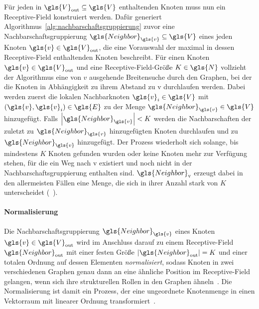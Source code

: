 Für jeden in $\gls{V}_{\mathrm{out}} \subseteq \gls{V}$ enthaltenden Knoten muss nun ein Receptive-Field konstruiert werden.
Dafür generiert Algorithmus~\ref{alg:nachbarschaftsgruppierung} zuvor eine Nachbarschaftsgruppierung $\gls{Neighbor}_{\gls{v}} \subseteq \gls{V}$ eines jeden Knoten $\gls{v} \in \gls{V}_{\mathrm{out}}$, die eine Vorauswahl der maximal in dessen Receptive-Field enthaltenden Knoten beschreibt.
Für einen Knoten $\gls{v} \in \gls{V}_{\mathrm{out}}$ und eine Receptive-Field-Größe $K \in \gls{N}$ vollzieht der Algorithmus eine von $v$ ausgehende Breitensuche durch den Graphen, bei der die Knoten in Abhängigkeit zu ihrem Abstand zu \gls{v} durchlaufen werden.
Dabei werden zuerst die lokalen Nachbarknoten $\gls{v}_i \in \gls{V}$ mit $\left(\gls{v}, \gls{v}_i\right) \in \gls{E}$ zu der Menge $\gls{Neighbor}_{\gls{v}} \in \gls{V}$ hinzugefügt.
Falls $\left|\gls{Neighbor}_{\gls{v}}\right| < K$ werden die Nachbarschaften der zuletzt zu $\gls{Neighbor}_{\gls{v}}$ hinzugefügten Knoten durchlaufen und zu $\gls{Neighbor}_{\gls{v}}$ hinzugefügt.
Der Prozess wiederholt sich solange, bis mindestens $K$ Knoten gefunden wurden oder keine Knoten mehr zur Verfügung stehen, für die ein Weg nach \gls{v} existiert und noch nicht in der Nachbarschaftsgruppierung enthalten sind.
$\gls{Neighbor}_{\mathrm{v}}$ erzeugt dabei in den allermeisten Fällen eine Menge, die sich in ihrer Anzahl stark von $K$ unterscheidet (\vgl{}~\cite{patchy}).

\paragraph{Normalisierung}
\label{normalisierung}

Die Nachbarschaftsgruppierung $\gls{Neighbor}_{\gls{v}}$ eines Knoten $\gls{v} \in \gls{V}_{\mathrm{out}}$ wird im Anschluss darauf zu einem Receptive-Field $\gls{Neighbor}_{\mathrm{out}}$ mit einer festen Größe $\left|\gls{Neighbor}_{\mathrm{out}}\right| = K$ und einer totalen Ordnung auf dessen Elementen \emph{normalisiert}, sodass Knoten in zwei verschiedenen Graphen genau dann an eine ähnliche Position im Receptive-Field gelangen, wenn sich ihre strukturellen Rollen in den Graphen ähneln~\cite{patchy}.
Die Normalisierung ist damit ein Prozess, der eine ungeordnete Knotenmenge in einen Vektorraum mit linearer Ordnung transformiert~\cite{patchy}.

